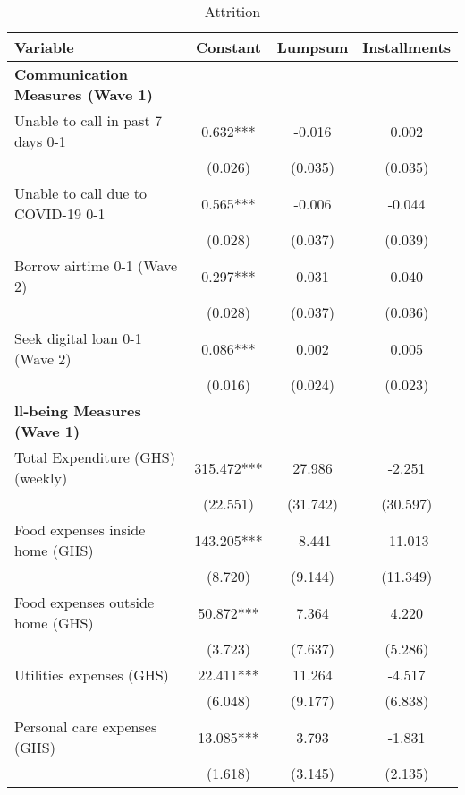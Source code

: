 \begin{ThreePartTable}
\begin{table}[tbp]\centering
\def\sym#1{\ifmmode^{#1}\else\(^{#1}\)\fi}
\caption{Attrition}
\begin{tabular}{lccc}
\hline
 Variable & Constant & Lumpsum & Installments \\ [0.1em] 
\hline\hline
\textbf{Communication Measures (Wave 1)} & & & \\ 
 Unable to call in past 7 days 0-1 & 0.632*** & -0.016 & 0.002 \\ [0.1em] 
                   &      (0.026)     &      (0.035)     &      (0.035)     \\ [0.1em] 
 Unable to call due to COVID-19 0-1 & 0.565*** & -0.006 & -0.044 \\ [0.1em] 
                   &      (0.028)     &      (0.037)     &      (0.039)     \\ [0.1em] 
 Borrow airtime 0-1 (Wave 2) & 0.297*** & 0.031 & 0.040 \\ [0.1em] 
                   &      (0.028)     &      (0.037)     &      (0.036)     \\ [0.1em] 
 Seek digital loan 0-1 (Wave 2) & 0.086*** & 0.002 & 0.005 \\ [0.1em] 
                   &      (0.016)     &      (0.024)     &      (0.023)     \\ [0.1em] 
\textbf{ll-being Measures (Wave 1)} & & & \\ 
 Total Expenditure (GHS) (weekly) & 315.472*** & 27.986 & -2.251 \\ [0.1em] 
                   &      (22.551)     &      (31.742)     &      (30.597)     \\ [0.1em] 
 Food expenses inside home (GHS) & 143.205*** & -8.441 & -11.013 \\ [0.1em] 
                   &      (8.720)     &      (9.144)     &      (11.349)     \\ [0.1em] 
 Food expenses outside home (GHS) & 50.872*** & 7.364 & 4.220 \\ [0.1em] 
                   &      (3.723)     &      (7.637)     &      (5.286)     \\ [0.1em] 
 Utilities expenses (GHS) & 22.411*** & 11.264 & -4.517 \\ [0.1em] 
                   &      (6.048)     &      (9.177)     &      (6.838)     \\ [0.1em] 
 Personal care expenses (GHS) & 13.085*** & 3.793 & -1.831 \\ [0.1em] 
                   &      (1.618)     &      (3.145)     &      (2.135)     \\ [0.1em] 

\end{tabular}
\end{table}
\end{ThreePartTable}
